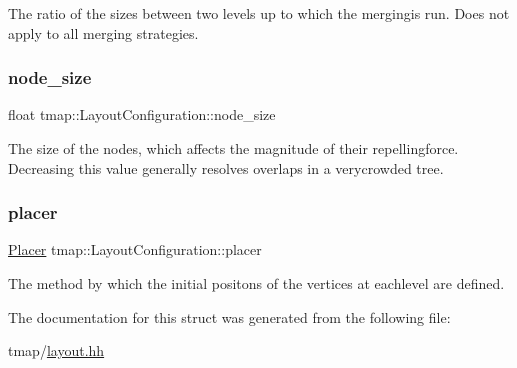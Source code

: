 The ratio of the sizes between two levels up to which the mergingis run. Does not apply to all merging strategies. \mbox{\label{structtmap_1_1LayoutConfiguration_a9a97e2c0c9edb212190d3afcc3ce2924}} 
\subsubsection{\texorpdfstring{node\+\_\+size}{node\_size}}
{\footnotesize\ttfamily float tmap\+::\+Layout\+Configuration\+::node\+\_\+size}

The size of the nodes, which affects the magnitude of their repellingforce. Decreasing this value generally resolves overlaps in a verycrowded tree. \mbox{\label{structtmap_1_1LayoutConfiguration_ae81108ee33f42b2c084b540f902bbb7d}} 
\subsubsection{\texorpdfstring{placer}{placer}}
{\footnotesize\ttfamily \hyperlink{layout_8hh_afdc98947e81dc6f4c30f256e6f42f90b}{Placer} tmap\+::\+Layout\+Configuration\+::placer}

The method by which the initial positons of the vertices at eachlevel are defined. 

The documentation for this struct was generated from the following file\+:\begin{DoxyCompactItemize}
\item 
tmap/\hyperlink{layout_8hh}{layout.\+hh}\end{DoxyCompactItemize}

